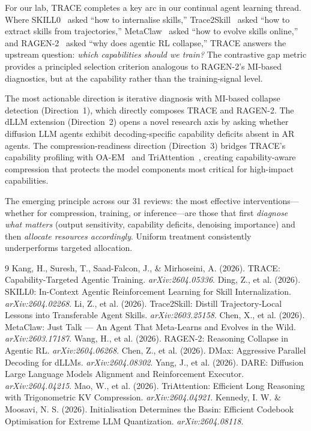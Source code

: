 \documentclass[11pt]{article}
\begin{document}
For our lab, TRACE completes a key arc in our continual agent learning thread. Where SKILL0~\cite{skill0} asked ``how to internalise skills,'' Trace2Skill~\cite{trace2skill} asked ``how to extract skills from trajectories,'' MetaClaw~\cite{metaclaw} asked ``how to evolve skills online,'' and RAGEN-2~\cite{ragen2} asked ``why does agentic RL collapse,'' TRACE answers the upstream question: \textit{which capabilities should we train?} The contrastive gap metric provides a principled selection criterion analogous to RAGEN-2's MI-based diagnostics, but at the capability rather than the training-signal level.

The most actionable direction is iterative diagnosis with MI-based collapse detection (Direction~1), which directly composes TRACE and RAGEN-2. The dLLM extension (Direction~2) opens a novel research axis by asking whether diffusion LLM agents exhibit decoding-specific capability deficits absent in AR agents. The compression-readiness direction (Direction~3) bridges TRACE's capability profiling with OA-EM~\cite{oaem} and TriAttention~\cite{triattention}, creating capability-aware compression that protects the model components most critical for high-impact capabilities.

The emerging principle across our 31 reviews: the most effective interventions---whether for compression, training, or inference---are those that first \textit{diagnose what matters} (output sensitivity, capability deficits, denoising importance) and then \textit{allocate resources accordingly}. Uniform treatment consistently underperforms targeted allocation.

\begin{thebibliography}{9}
 Kang, H., Suresh, T., Saad-Falcon, J., \& Mirhoseini, A. (2026). TRACE: Capability-Targeted Agentic Training. \textit{arXiv:2604.05336}.
 Ding, Z., et al. (2026). SKILL0: In-Context Agentic Reinforcement Learning for Skill Internalization. \textit{arXiv:2604.02268}.
 Li, Z., et al. (2026). Trace2Skill: Distill Trajectory-Local Lessons into Transferable Agent Skills. \textit{arXiv:2603.25158}.
 Chen, X., et al. (2026). MetaClaw: Just Talk --- An Agent That Meta-Learns and Evolves in the Wild. \textit{arXiv:2603.17187}.
 Wang, H., et al. (2026). RAGEN-2: Reasoning Collapse in Agentic RL. \textit{arXiv:2604.06268}.
 Chen, Z., et al. (2026). DMax: Aggressive Parallel Decoding for dLLMs. \textit{arXiv:2604.08302}.
 Yang, J., et al. (2026). DARE: Diffusion Large Language Models Alignment and Reinforcement Executor. \textit{arXiv:2604.04215}.
 Mao, W., et al. (2026). TriAttention: Efficient Long Reasoning with Trigonometric KV Compression. \textit{arXiv:2604.04921}.
 Kennedy, I. W. \& Moosavi, N. S. (2026). Initialisation Determines the Basin: Efficient Codebook Optimisation for Extreme LLM Quantization. \textit{arXiv:2604.08118}.
\end{thebibliography}
\end{document}
